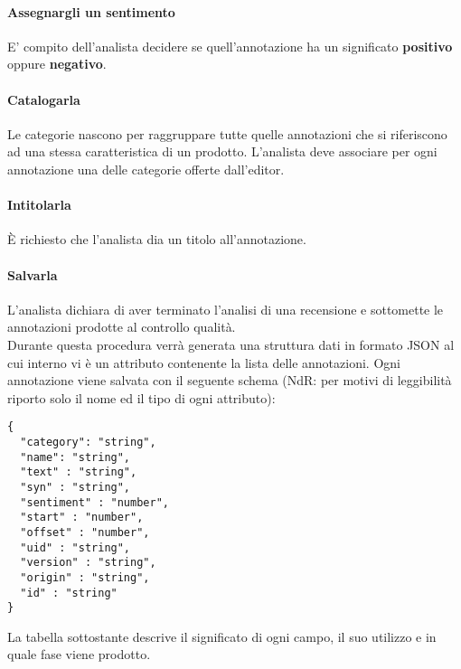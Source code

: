 \paragraph{Assegnargli un sentimento}
\label{sentimento}
E' compito dell'analista decidere se quell'annotazione ha un significato
\textbf{positivo} oppure \textbf{negativo}.

\paragraph{Catalogarla}
\label{catalogarla}
Le categorie nascono per raggruppare tutte quelle annotazioni che si
riferiscono ad una stessa caratteristica di un prodotto. L'analista deve
associare per ogni annotazione una delle categorie offerte dall'editor.

\paragraph{Intitolarla}
\label{intitolarla}
È richiesto che l'analista dia un titolo all'annotazione.

\paragraph{Salvarla}
\label{salvarla}
L'analista dichiara di aver terminato l'analisi di una recensione e sottomette
le annotazioni prodotte al controllo qualità. \\

Durante questa procedura verrà generata una struttura dati in formato \gls{JSON}
al cui interno vi è un attributo contenente la lista delle annotazioni. Ogni
annotazione viene salvata con il seguente schema (NdR: per motivi di leggibilità
riporto solo il nome ed il tipo di ogni attributo):

\begin{center}
\begin{lstlisting}[frame=single]
{
  "category": "string",
  "name": "string",
  "text" : "string",
  "syn" : "string",
  "sentiment" : "number",
  "start" : "number",
  "offset" : "number",
  "uid" : "string",
  "version" : "string",
  "origin" : "string",
  "id" : "string"
}
\end{lstlisting}
\end{center}

La tabella sottostante descrive il significato di ogni campo, il suo utilizzo e
in quale fase viene prodotto.

